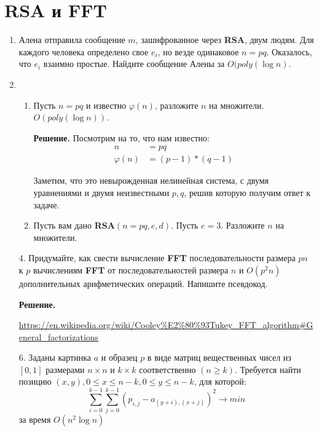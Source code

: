 \section*{RSA и FFT}
\begin{enumerate}
	\item Алена отправила сообщение $m$, зашифрованное через \textbf{RSA}, двум людям. Для каждого человека 
	определено свое $e_i$, но везде одинаковое $n = pq$. Оказалось, что $e_i$ взаимно простые. Найдите сообщение 
	Алены за $O(poly(\log n)$.
	
	\item 
	\begin{enumerate}
		\item Пусть $n = pq$ и известно $\varphi(n)$, разложите $n$ на множители. $O(poly(\log n))$.
		
		\textbf{Решение.} Посмотрим на то, что нам известно:
		\begin{align*}
			n &= pq \\
			\varphi(n) &= (p - 1) * (q - 1)
		\end{align*} 
		
		Заметим, что это невырожденная нелинейная система, с двумя уравнениями и двумя неизвестными $p, q$, решив которую получим ответ к задаче. 
			
		\item Пусть вам дано \textbf{RSA}$(n = pq, e, d)$. Пусть $e = 3$. Разложите $n$ на множители.
	\end{enumerate}
	
	\item[4.] Придумайте, как свести вычисление \textbf{FFT} последовательности размера $pn$ к $p$ вычислениям 
	\textbf{FFT} от	последовательностей размера $n$ и $O(p^2n)$ дополнительных арифметических операций. Напишите 
	псевдокод.
	
	\textbf{Решение.}
	
	\url{https://en.wikipedia.org/wiki/Cooley%E2%80%93Tukey_FFT_algorithm#General_factorizations}
	
	\item[6.] Заданы картинка $a$ и образец $p$ в виде матриц вещественных чисел из $[0, 1]$ размерами $n \times n$ 
	и $k \times k$ соответственно $(n \geqslant k)$. Требуется найти позицию $(x, y), 0 \leqslant x \leqslant n - 
	k, 0 \leqslant y \leqslant n - k$, для которой:
	\begin{equation*}
		\sum\limits_{i = 0}^{k - 1} \sum\limits_{j = 0}^{k - 1} (p_{i,j} - a_{(y + i), (x + j)})^2 \rightarrow min
	\end{equation*}
	за время $O(n^2\log n)$
	

\end{enumerate}

